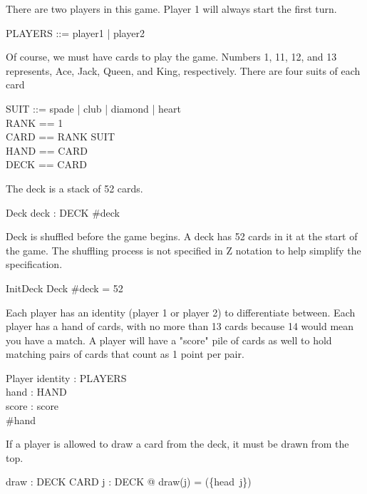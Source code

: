 \documentclass{article}
\begin{document}
There are two players in this game. Player 1 will always start the first turn.
\begin{zed} 
    PLAYERS ::= player1 | player2
\end{zed}

Of course, we must have cards to play the game.
Numbers 1, 11, 12, and 13 represents, Ace, Jack, Queen, and King, respectively.
There are four suits of each card
\begin{zed}
    SUIT ::= spade | club | diamond | heart \\
    RANK == 1 \\
    CARD == RANK \cross SUIT \\
    HAND == \power CARD \\
    DECK == \seq CARD \\
\end{zed}

\clearpage

The deck is a stack of 52 cards. 
\begin{schema}{Deck}
    deck : DECK
    \where
    \#deck 
\end{schema}

Deck is shuffled before the game begins. A deck has 52 cards in it at the
start of the game. The shuffling process is not specified in Z notation
to help simplify the specification.
\begin{schema}{InitDeck}
    Deck
    \where
    \#deck = 52
\end{schema}

Each player has an identity (player 1 or player 2) to
differentiate between. Each player has a hand of cards, with
no more than 13 cards because 14 would mean you have a match.
A player will have a "score" pile of cards as well to hold
matching pairs of cards that count as 1 point per pair.

\begin{schema}{Player}
    identity : PLAYERS \\
    hand : HAND \\
    score : \nat
    \where
    score  \\
    \#hand 
\end{schema}

If a player is allowed to draw a card from the deck, it must be drawn from the top.
\begin{axdef}
    draw : DECK \fun \power CARD
    \where
    \forall j : DECK @ draw(j) = (\{head~j\})
\end{axdef}
\end{document}
